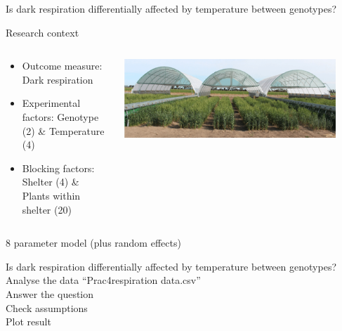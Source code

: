 \documentclass[10pt]{beamer}
\begin{document}
\begin{frame}{Is dark respiration differentially affected by temperature between genotypes?}
  \begin{block}{Research context}
 \begin{columns}
  \begin{column}{0.8\textwidth}
   \begin{itemize}
      \item Outcome measure: Dark respiration
      \item Experimental factors:  Genotype (2) \& Temperature (4)
      \item Blocking factors:  Shelter (4) \&  Plants within shelter (20)

   \end{itemize}
  \end{column}
  \begin{column}{0.2\textwidth}
    \includegraphics[width=0.9\textwidth]{Figures/darkresp}
  \end{column}

 \end{columns}
 \end{block}

8 parameter model (plus random effects)
 
 \end{frame}

\begin{frame}{Is dark respiration differentially affected by temperature between genotypes?}
 Analyse the data ``Prac4respiration data.csv''\\
 Answer the question\\
 Check assumptions\\
 Plot result
\end{frame}
\end{document}
